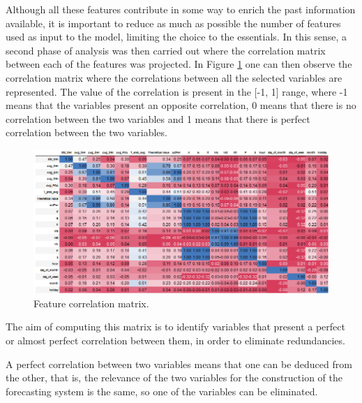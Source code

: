 Although all these features contribute in some way to enrich the past information available, it is important to reduce as much as possible the number of features used as input to the model, limiting the choice to the essentials.
In this sense, a second phase of analysis was then carried out where the correlation matrix between each of the features was projected. In Figure \ref{corr} one can then observe the correlation matrix where the correlations between all the selected variables are represented. The value of the correlation is present in the [-1, 1] range, where -1 means that the variables present an opposite correlation, 0 means that there is no correlation between the two variables and 1 means that there is perfect correlation between the two variables. 


\begin{figure}[h!]
    \centering
    \begin{center}
    \includegraphics[width=1\textwidth]{Images/corr.PNG}
    \caption{Feature correlation matrix.}
    \label{corr}
    \end{center}
\end{figure}


The aim of computing this matrix is to identify variables that present a perfect or almost perfect correlation between them, in order to eliminate redundancies. 

A perfect correlation between two variables means that one can be deduced from the other, that is, the relevance of the two variables for the construction of the forecasting system is the same, so one of the variables can be eliminated. 


